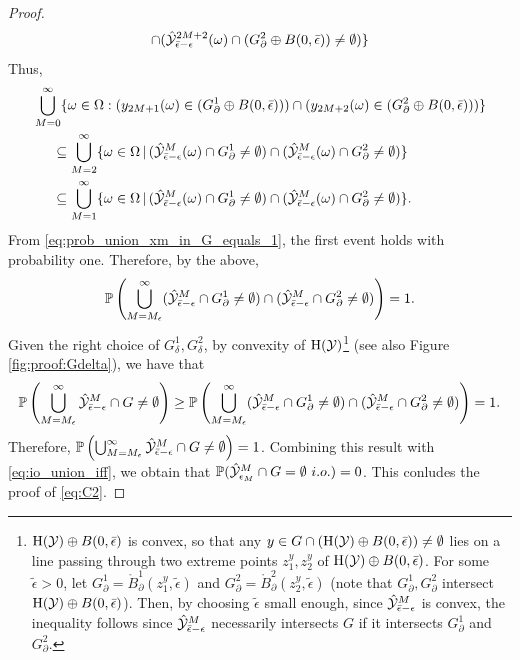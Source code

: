 \documentclass[12pt]{l4dc2022} %
\begin{document}
\begin{proof}
\begin{align*}
\cap
(\hat{\mathcal{Y}}^{2M+2}_{\bar{\epsilon}-\epsilon}(\omega)\cap (G_\partial^2\oplus B(0,\bar{\epsilon}))\neq\emptyset)
\} 
\end{align*}
Thus, 
\begin{align*}
&\bigcup_{M=0}^\infty
\{\omega\in\Omega: (y_{2M+1}(\omega)\in (G_\partial^1\oplus B(0,\bar{\epsilon})))\cap (y_{2M+2}(\omega)\in (G_\partial^2\oplus B(0,\bar{\epsilon})))\}
\\
&\hspace{5mm}\subseteq
\bigcup_{M=2}^\infty
\{\omega\in\Omega \,|\,  
(\hat{\mathcal{Y}}^M_{\bar{\epsilon}-\epsilon}(\omega)\cap G_\partial^1\neq\emptyset)
\cap
(\hat{\mathcal{Y}}^M_{\bar{\epsilon}-\epsilon}(\omega)\cap G_\partial^2\neq\emptyset)
\} 
\\
&\hspace{5mm}\subseteq
\bigcup_{M=1}^\infty
\{\omega\in\Omega \,|\, 
(\hat{\mathcal{Y}}^M_{\bar{\epsilon}-\epsilon}(\omega)\cap G_\partial^1\neq\emptyset)
\cap
(\hat{\mathcal{Y}}^M_{\bar{\epsilon}-\epsilon}(\omega)\cap G_\partial^2\neq\emptyset)
\}.
\end{align*}
From \eqref{eq:prob_union_xm_in_G_equals_1}, the first event holds with probability one. Therefore, by the above, 
$$
\mathbb{P}\left(
\bigcup_{M=M_\epsilon}^\infty
(\hat{\mathcal{Y}}^M_{\bar{\epsilon}-\epsilon}\cap G_\partial^1\neq\emptyset)
\cap
(\hat{\mathcal{Y}}^M_{\bar{\epsilon}-\epsilon}\cap G_\partial^2\neq\emptyset)
\right)=1.
$$
Given the right choice of $G_\delta^1,G_\delta^2$, by convexity of $\textrm{H}(\mathcal{Y})$\footnote{$\textrm{H}(\mathcal{Y})\oplus B(0,\bar\epsilon)$ is convex, so that any $y\in G\cap (\textrm{H}(\mathcal{Y})\oplus B(0,\bar\epsilon))\neq\emptyset$ lies on a line passing through two extreme points $z_1^y,z_2^y$ of $\textrm{H}(\mathcal{Y})\oplus B(0,\bar\epsilon)$.  
For some $\tilde\epsilon>0$, let $G_\partial^1=\mathring{B}_\partial^1(z_1^y,\tilde\epsilon)$ and $G_\partial^2=\mathring{B}_\partial^2(z_2^y,\tilde\epsilon)$ (note that $G_\partial^1,G_\partial^2$ intersect $\textrm{H}(\mathcal{Y})\oplus B(0,\bar\epsilon)$). 
Then,  
by choosing $\tilde\epsilon$ small enough, 
since  $\hat{\mathcal{Y}}^M_{\bar{\epsilon}-\epsilon}$ is convex,  the inequality follows since  $\hat{\mathcal{Y}}^M_{\bar{\epsilon}-\epsilon}$ necessarily intersects $G$ if it intersects $G_\partial^1$ and $G_\partial^2$. } (see also Figure \ref{fig:proof:Gdelta}), we have that
\begin{align*}\label{eq:prob_YM_cap_G_neq_empty_is_1}
\mathbb{P}\left(\bigcup_{M=M_\epsilon}^\infty
\hat{\mathcal{Y}}^M_{\bar{\epsilon}-\epsilon}\cap G
\neq\emptyset\right)\geq
\mathbb{P}\left(
\bigcup_{M=M_\epsilon}^\infty
(\hat{\mathcal{Y}}^M_{\bar{\epsilon}-\epsilon}\cap G_\partial^1\neq\emptyset)
\cap
(\hat{\mathcal{Y}}^M_{\bar{\epsilon}-\epsilon}\cap G_\partial^2\neq\emptyset)
\right)
=1.
\end{align*}
Therefore, 
$\mathbb{P}\left(\bigcup_{M=M_\epsilon}^\infty
\hat{\mathcal{Y}}^M_{\bar{\epsilon}-\epsilon}\cap G
\neq\emptyset\right)=1$. 
Combining this result with \eqref{eq:io_union_iff}, we obtain that $\mathbb{P}(\hat{\mathcal{Y}}^M_{\epsilon_M}\cap G = \emptyset \ i.o.) = 0$. 
This conludes the proof of \eqref{eq:C2}. 




\end{proof}
\end{document}
